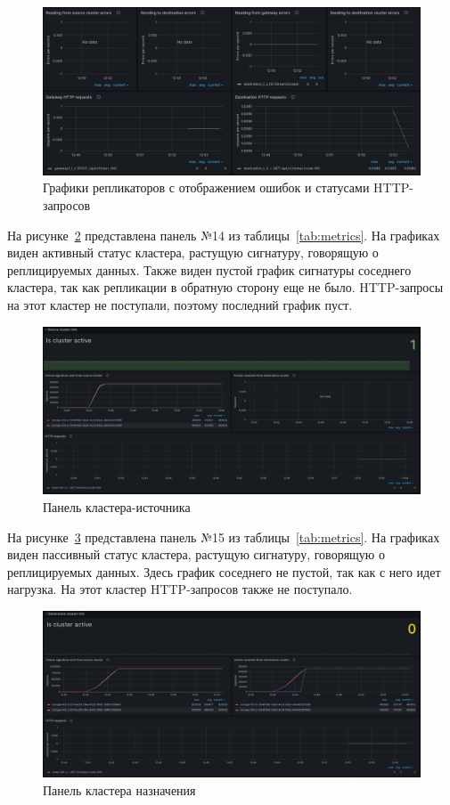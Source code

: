 \begin{figure}
  \centering
  \includegraphics[scale=0.2]{assets/replicators_info_graph_3.jpeg}
  \caption{Графики репликаторов с отображением ошибок и статусами HTTP-запросов}
  \label{fig:fig04}
\end{figure}

На рисунке~\ref{fig:fig05} представлена панель №14 из таблицы~\ref{tab:metrics}. На графиках виден активный
статус кластера, растущую сигнатуру, говорящую о реплицируемых данных. Также виден пустой график сигнатуры
соседнего кластера, так как репликации в обратную сторону еще не было. HTTP-запросы на этот кластер не
поступали, поэтому последний график пуст.

\begin{figure}
  \centering
  \includegraphics[scale=0.2]{assets/source_cluster_info.jpeg}
  \caption{Панель кластера-источника}
  \label{fig:fig05}
\end{figure}

На рисунке~\ref{fig:fig06} представлена панель №15 из таблицы~\ref{tab:metrics}. На графиках виден
пассивный статус кластера, растущую сигнатуру, говорящую о реплицируемых данных. Здесь график соседнего
не пустой, так как с него идет нагрузка. На этот кластер HTTP-запросов также не поступало.

\begin{figure}
  \centering
  \includegraphics[scale=0.2]{assets/destination_cluster_info.jpeg}
  \caption{Панель кластера назначения}
  \label{fig:fig06}
\end{figure}

